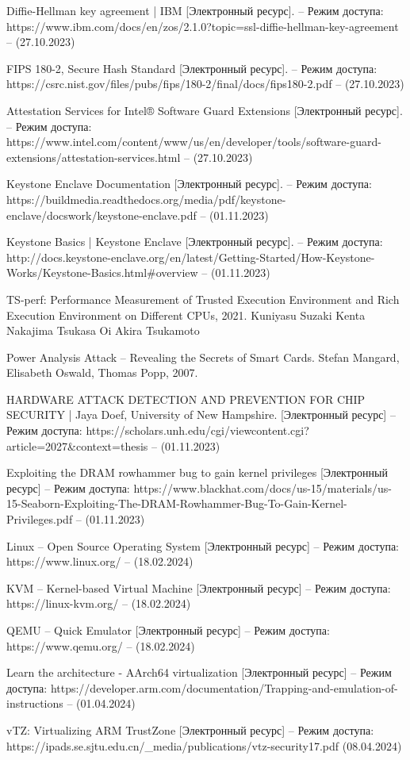 \begin{thebibliography}{}
Diffie-Hellman key agreement | IBM [Электронный ресурс]. – Режим доступа: https://www.ibm.com/docs/en/zos/2.1.0?topic=ssl-diffie-hellman-key-agreement – (27.10.2023)

FIPS 180-2, Secure Hash Standard [Электронный ресурс]. – Режим доступа: https://csrc.nist.gov/files/pubs/fips/180-2/final/docs/fips180-2.pdf – (27.10.2023)

Attestation Services for Intel® Software Guard Extensions [Электронный ресурс]. – Режим доступа: https://www.intel.com/content/www/us/en/developer/tools/software-guard-extensions/attestation-services.html – (27.10.2023)

Keystone Enclave Documentation [Электронный ресурс]. – Режим доступа: https://buildmedia.readthedocs.org/media/pdf/keystone-enclave/docswork/keystone-enclave.pdf – (01.11.2023)

Keystone Basics | Keystone Enclave [Электронный ресурс]. – Режим доступа: http://docs.keystone-enclave.org/en/latest/Getting-Started/How-Keystone-Works/Keystone-Basics.html\#overview – (01.11.2023)

TS-perf: Performance Measurement of Trusted Execution Environment and Rich Execution Environment on Different CPUs, 2021. Kuniyasu Suzaki Kenta Nakajima Tsukasa Oi Akira Tsukamoto

Power Analysis Attack -- Revealing the Secrets of Smart Cards. Stefan Mangard, Elisabeth Oswald, Thomas Popp, 2007.

HARDWARE ATTACK DETECTION AND PREVENTION FOR CHIP SECURITY | Jaya Doef, University of New Hampshire. [Электронный ресурс] – Режим доступа: https://scholars.unh.edu/cgi/viewcontent.cgi?article=2027\&context=thesis – (01.11.2023)

Exploiting the DRAM rowhammer bug to gain kernel privileges [Электронный ресурс] – Режим доступа: https://www.blackhat.com/docs/us-15/materials/us-15-Seaborn-Exploiting-The-DRAM-Rowhammer-Bug-To-Gain-Kernel-Privileges.pdf – (01.11.2023)

Linux -- Open Source Operating System [Электронный ресурс] – Режим доступа: https://www.linux.org/ – (18.02.2024)

KVM -- Kernel-based Virtual Machine [Электронный ресурс] – Режим доступа: https://linux-kvm.org/ – (18.02.2024)

QEMU -- Quick Emulator [Электронный ресурс] – Режим доступа: https://www.qemu.org/ – (18.02.2024)

Learn the architecture - AArch64 virtualization [Электронный ресурс] – Режим доступа: https://developer.arm.com/documentation/Trapping-and-emulation-of-instructions – (01.04.2024)

vTZ: Virtualizing ARM TrustZone [Электронный ресурс] – Режим доступа:
https://ipads.se.sjtu.edu.cn/\_media/publications/vtz-security17.pdf (08.04.2024)


\end{thebibliography}
\endgroup

\pagebreak